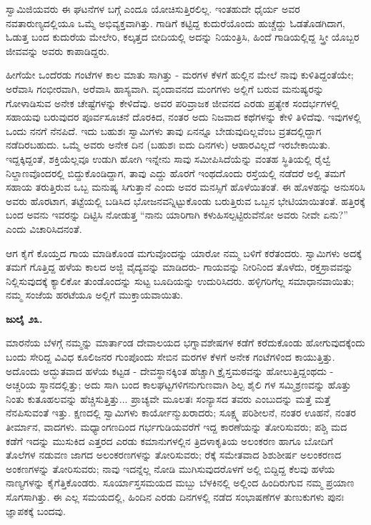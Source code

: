 ಸ್ವಾಮಿಜಿಯವರು ಈ ಘಟನೆಗಳ ಬಗ್ಗೆ ಎಂದೂ ಯೋಚಿಸುತ್ತಿರಲಿಲ್ಲ. ಇಂತಹುದೇ ಧೈರ್ಯ ಅವರ ನವತಾರುಣ್ಯದಲ್ಲಿಯೂ ಒಮ್ಮೆ ಅಭಿವ್ಯಕ್ತವಾಗಿತ್ತು. ಗಾಡಿಗೆ ಕಟ್ಟಿದ್ದ ಕುದುರೆಯೊಂದು ಹುಚ್ಚೆದ್ದು ಓಡತೊಡಗಿದಾಗ, ಓಡುತ್ತ ಬಂದ ಕುದುರೆಯ ಮೇಲೇರಿ, ಕಲ್ಕತ್ತದ ಬೀದಿಯಲ್ಲಿ ಅದನ್ನು ನಿಯಂತ್ರಿಸಿ, ಹಿಂದೆ ಗಾಡಿಯಲ್ಲಿದ್ದ ಸ್ತ್ರೀ ಯೊಬ್ಬರ ಜೀವವನ್ನು ಅವರು ಕಾಪಾಡಿದ್ದರು.

ಹೀಗೆಯೇ ಒಂದೆರಡು ಗಂಟೆಗಳ ಕಾಲ ಮಾತು ಸಾಗಿತ್ತು - ಮರಗಳ ಕೆಳಗೆ ಹುಲ್ಲಿನ ಮೇಲೆ ನಾವು ಕುಳಿತಿದ್ದಂತೆಯೇ; ಅರೆವಾಸಿ ಗಂಭೀರವಾಗಿ, ಅರೆವಾಸಿ ಹಾಸ್ಯವಾಗಿ. ವೃಂದಾವನದ ಮಂಗಗಳು ಅಲ್ಲಿಗೆ ಬರುವ ಮನುಷ್ಯರನ್ನು ಗೋಳಾಡಿಸುವ ಅನೇಕ ಚೇಷ್ಟೆಗಳನ್ನು ಕೇಳಿದೆವು. ಅವರ ಪರಿವ್ರಾಜಕ ಜೀವನದ ಎರಡು ಪ್ರತ್ಯೇಕ ಸಂದರ್ಭಗಳಲ್ಲಿ ಸಹಾಯವು ಬರುವುದರ ಪೂರ್ವಸೂಚನೆ ದೊರಕಿದ, ನಂತರ ಅದು ನಿಜವಾದ ಕಥೆಗಳನ್ನು ಕೇಳಿ ತಿಳಿದೆವು. ಇವುಗಳಲ್ಲಿ ಒಂದು ನನಗೆ ನೆನಪಿದೆ. ಇದು ಬಹುಶಃ ಸ್ವಾಮಿಗಳು ತಾವು ಏನನ್ನೂ ಬೇಡುವುದಿಲ್ಲವೆಂಬ ವ್ರತದಲ್ಲಿದ್ದಾಗ ನಡೆದಿರಬಹುದು. ಒಮ್ಮೆ ಅವರು ಅನೇಕ ದಿನ (ಬಹುಶಃ ಐದು ದಿನಗಳು) ಆಹಾರವಿಲ್ಲದೆ ಇರಬೇಕಾಯಿತು. ಇದ್ದಕ್ಕಿದ್ದಂತೆ, ಶಕ್ತಿಯೆಲ್ಲವೂ ಉಡುಗಿ ಹೋಗಿ ಇನ್ನೇನು ಸಾವು ಸಮೀಪಿಸಿದೆಯೆನ್ನು ವಂತಹ ಸ್ಥಿತಿಯಲ್ಲಿ ರೈಲ್ವೆ ನಿಲ್ದಾಣವೊಂದರಲ್ಲಿ ಬಿದ್ದುಕೊಂಡಿದ್ದಾಗ, ತಾವು ಎದ್ದು ಹೊರಗೆ ಇಂಥದೊಂದು ರಸ್ತೆಯಲ್ಲಿ ನಡೆದರೆ ಅಲ್ಲಿ ತಮಗೆ ಸಹಾಯ ತರುತ್ತಿರುವ ಒಬ್ಬ ಮನುಷ್ಯ ಸಿಗುತ್ತಾನೆ ಎಂದು ಅವರ ಮನಸ್ಸಿಗೆ ಹೊಳೆಯಿತಂತೆ. ಈ ಹೊಳಹನ್ನು ಅನುಸರಿಸಿ ಅವರು ಹೊರಟಾಗ, ತಟ್ಟೆಯಲ್ಲಿ ಬಡಿಸಿದ ಭೋಜನವನ್ನಿಟ್ಟುಕೊಂಡು ಬರುತ್ತಿರುವ ಒಬ್ಬನ ಭೇಟಿಯಾಯಿತಂತೆ. ಹತ್ತಿರಕ್ಕೆ ಬಂದ ಅವನು ಇವರನ್ನು ದಿಟ್ಟಿಸಿ ನೋಡುತ್ತ “ನಾನು ಯಾರಿಗಾಗಿ ಕಳುಹಿಸಲ್ಪಟ್ಟಿರುವೆನೋ ಅವರು ನೀವೇ ಏನು?” ಎಂದು ವಿಚಾರಿಸಿದನಂತೆ.

ಆಗ ಕೈಗೆ ಕೊಯ್ತದ ಗಾಯ ಮಾಡಿಕೊಂಡ ಮಗುವೊಂದನ್ನು ಯಾರೋ ನಮ್ಮ ಬಳಿಗೆ ಕರೆತಂದರು. ಸ್ವಾಮಿಗಳು ಅದಕ್ಕೆ ತಮಗೆ ಗೊತ್ತಿದ್ದ ಹಳೆಯ ಕಾಲದ ಅಜ್ಜಿ ವೈದ್ಯವನ್ನು ಮಾಡಿದರು- ಗಾಯವನ್ನು ನೀರಿನಿಂದ ತೊಳೆದು, ರಕ್ತಸ್ರಾವವನ್ನು ನಿಲ್ಲಿಸುವುದಕ್ಕೆ ಕ್ಯಾಲಿಕೋ ತುಂಡೊಂದನ್ನು ಸುಟ್ಟ ಬೂದಿಯನ್ನು ಉದುರಿಸಿದರು. ಹಳ್ಳಿಗರಿಗೆಲ್ಲ ಸಮಾಧಾನವಾಯಿತು; ನಮ್ಮ ಸಂಜೆಯ ಹರಟೆಯೂ ಅಲ್ಲಿಗೆ ಮುಕ್ತಾಯವಾಯಿತು.

\textbf{ಜುಲೈ ೨೩.}

ಮಾರನೆಯ ಬೆಳಗ್ಗೆ ನಮ್ಮನ್ನು ಮಾರ್ತಾಂಡ ದೇವಾಲಯದ ಭಗ್ನಾವಶೇಷಗಳ ಕಡೆಗೆ ಕರೆದುಕೊಂಡು ಹೋಗುವುದಕ್ಕೆಂದು ಬಂದು ಸೇರಿದ್ದ ವಿವಿಧ ಕೂಲಿಜನರ ಗುಂಪೊಂದು ಸೇಬಿನ ಮರಗಳ ಕೆಳಗೆ ಅನೇಕ ಗಂಟೆಗಳಿಂದ ಕಾಯುತ್ತಿತ್ತು. ಅದೊಂದು ಅದ್ಭುತವಾದ ಹಳೆಯ ಕಟ್ಟಡ - ದೇವಸ್ಥಾನಕ್ಕಿಂತ ಹೆಚ್ಚಾಗಿ ಕ್ರೈಸ್ತಮಠವನ್ನು ಹೋಲುತ್ತಿದ್ದಂಥದು - ಅಚ್ಚರಿಯ ಸ್ಥಾನದಲ್ಲಿತ್ತು; ಅದು ಸಾಗಿ ಬಂದ ಕಾಲಘಟ್ಟಗಳಿಗನುಗುಣವಾಗಿ ಶಿಲ್ಪ ಶೈಲಿ ಗಳ ಸಮ್ಮಿಶ್ರಣವನ್ನು ಹೊತ್ತು ನಿಂತು ಕುತೂಹಲವನ್ನು ಹೆಚ್ಚಿಸುತ್ತಿತ್ತು... ಪ್ರಾಚ್ಯವೇ ಮೂಲತಃ ಸಂನ್ಯಾಸದ ತವರು ಎಂಬುದನ್ನು ಮತ್ತೆ ಮತ್ತೆ ನೆನಪಿಸುವಂತೆ ಇತ್ತು. ಕ್ಷಣದಲ್ಲಿ ಸ್ವಾಮಿಗಳು ಕಾರ್ಯೋನ್ಮುಖರಾದರು; ಸೂಕ್ಷ್ಮ ಪರಿಶೀಲನೆ, ನಂತರ ಊಹನೆ, ನಂತರ ತೀರ್ಮಾನ, ವಾದಗಳು. ಮಧ್ಯಾಂಗಣದಿಂದ ಗರ್ಭಗುಡಿಯವರೆಗೆ ಇದ್ದ ಕಾರಣೆಯನ್ನು ತೋರಿಸುವರು; ಪಶ್ಚಿ ಮದ ಕಡೆಗೆ ಇದನ್ನು ಮುಸುಕಿದ ಎತ್ತರದ ಎರಡು ಕಮಾನುಗಳಲ್ಲಿನ ತ್ರಿದಳಾಕೃತಿಯ ಅಲಂಕರಣ ಹಾಗೂ ಬೋದಿಗೆ ತೊಲೆಗಳ ನಡುವಣ ಜಾಗದ ಅಲಂಕರಣಗಳನ್ನು ತೋರಿಸುವರು; ರೆಕ್ಕೆ ಸಮೇತವಾದ ಶಿಶುಶೀರ್ಷ ಅಲಂಕರಣದ ಅಂಕಣಗಳನ್ನು ತೋರಿಸುವರು; ನಾವು ಇದನ್ನೆಲ್ಲ ನೋಡಿ ಮುಗಿಸುವುದರೊಳಗೆ ಅಲ್ಲಿ ಬಿದ್ದಿದ್ದ ಕೆಲವು ಹಳೆಯ ನಾಣ್ಯಗಳನ್ನು ಕೈಗೆತ್ತಿಕೊಂಡರು. ಸೂರ್ಯಾಸ್ತಸಮಯದ ಮಬ್ಬು ಬೆಳಕಿನಲ್ಲಿ ಅಲ್ಲಿಂದ ಹಿಂದಿರುಗುವ ನಮ್ಮ ಪ್ರಯಾಣ ಸೊಗಸಾಗಿತ್ತು. ಈ ಎಲ್ಲ ಸಮಯದಲ್ಲಿ, ಹಿಂದಿನ ಎರಡು ದಿನಗಳಲ್ಲಿ ನಡೆದ ಸಂಭಾಷಣೆಗಳ ತುಣುಕುಗಳು ಪುನಃ ಜ್ಞಾಪಕಕ್ಕೆ ಬಂದವು.

